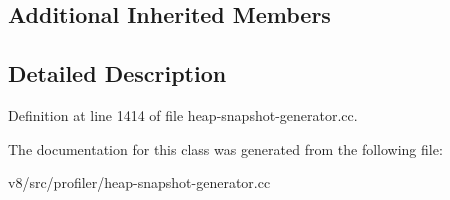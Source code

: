 \subsection*{Additional Inherited Members}


\subsection{Detailed Description}


Definition at line 1414 of file heap-\/snapshot-\/generator.\+cc.



The documentation for this class was generated from the following file\+:\begin{DoxyCompactItemize}
\item 
v8/src/profiler/heap-\/snapshot-\/generator.\+cc\end{DoxyCompactItemize}
